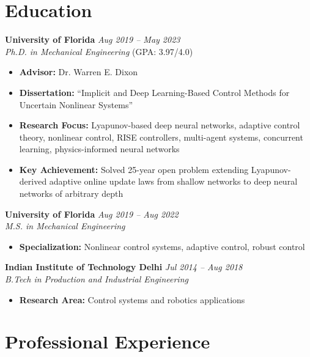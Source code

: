 \documentclass[10pt, letterpaper]{article}
\begin{document}
    \section{Education}


\textbf{University of Florida} \hfill \textit{Aug 2019 -- May 2023}\\
\textit{Ph.D. in Mechanical Engineering} (GPA: 3.97/4.0)
\begin{itemize}[leftmargin=20pt, itemsep=1pt]
    \item \textbf{Advisor:} Dr. Warren E. Dixon
    \item \textbf{Dissertation:} ``Implicit and Deep Learning-Based Control Methods for Uncertain Nonlinear Systems''
    \item \textbf{Research Focus:} Lyapunov-based deep neural networks, adaptive control theory, nonlinear control, RISE controllers, multi-agent systems, concurrent learning, physics-informed neural networks
    \item \textbf{Key Achievement:} Solved 25-year open problem extending Lyapunov-derived adaptive online update laws from shallow networks to deep neural networks of arbitrary depth
\end{itemize}

\textbf{University of Florida} \hfill \textit{Aug 2019 -- Aug 2022}\\
\textit{M.S. in Mechanical Engineering}
\begin{itemize}[leftmargin=20pt, itemsep=1pt]
    \item \textbf{Specialization:} Nonlinear control systems, adaptive control, robust control
\end{itemize}

\textbf{Indian Institute of Technology Delhi} \hfill \textit{Jul 2014 -- Aug 2018}\\
\textit{B.Tech in Production and Industrial Engineering}
\begin{itemize}[leftmargin=20pt, itemsep=1pt]
    \item \textbf{Research Area:} Control systems and robotics applications
\end{itemize}

\section{Professional Experience}
\end{document}
